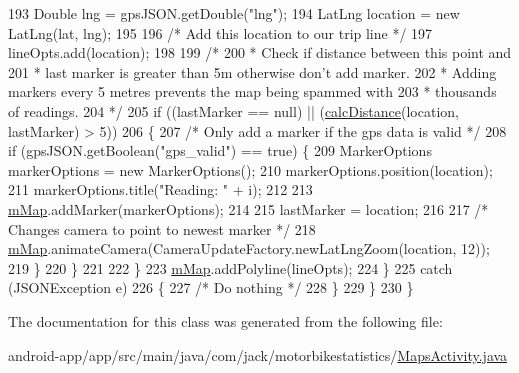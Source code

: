 \begin{DoxyCode}
193                     Double lng = gpsJSON.getDouble(\textcolor{stringliteral}{"lng"});
194                     LatLng location = \textcolor{keyword}{new} LatLng(lat, lng);
195 
196                     \textcolor{comment}{/* Add this location to our trip line */}
197                     lineOpts.add(location);
198 
199                     \textcolor{comment}{/*}
200 \textcolor{comment}{                     * Check if distance between this point and}
201 \textcolor{comment}{                     * last marker is greater than 5m otherwise don't add marker.}
202 \textcolor{comment}{                     * Adding markers every 5 metres prevents the map being spammed with}
203 \textcolor{comment}{                     * thousands of readings.}
204 \textcolor{comment}{                     */}
205                     \textcolor{keywordflow}{if} ((lastMarker == null) || (\hyperlink{classcom_1_1jack_1_1motorbikestatistics_1_1_maps_activity_af4feb7617c02a59c62d6e9257914e997}{calcDistance}(location, lastMarker) > 5))
206                     \{
207                         \textcolor{comment}{/* Only add a marker if the gps data is valid */}
208                         \textcolor{keywordflow}{if} (gpsJSON.getBoolean(\textcolor{stringliteral}{"gps\_valid"}) == \textcolor{keyword}{true}) \{
209                             MarkerOptions markerOptions = \textcolor{keyword}{new} MarkerOptions();
210                             markerOptions.position(location);
211                             markerOptions.title(\textcolor{stringliteral}{"Reading: "} + i);
212 
213                             \hyperlink{classcom_1_1jack_1_1motorbikestatistics_1_1_maps_activity_aaace5219464acf3df9ac5e9ce913eef5}{mMap}.addMarker(markerOptions);
214 
215                             lastMarker = location;
216 
217                             \textcolor{comment}{/* Changes camera to point to newest marker */}
218                             \hyperlink{classcom_1_1jack_1_1motorbikestatistics_1_1_maps_activity_aaace5219464acf3df9ac5e9ce913eef5}{mMap}.animateCamera(CameraUpdateFactory.newLatLngZoom(location, 12));
219                         \}
220                     \}
221 
222                 \}
223                 \hyperlink{classcom_1_1jack_1_1motorbikestatistics_1_1_maps_activity_aaace5219464acf3df9ac5e9ce913eef5}{mMap}.addPolyline(lineOpts);
224             \}
225             \textcolor{keywordflow}{catch} (JSONException e)
226             \{
227                 \textcolor{comment}{/* Do nothing */}
228             \}
229         \}
230     \}
\end{DoxyCode}


The documentation for this class was generated from the following file\+:\begin{DoxyCompactItemize}
\item 
android-\/app/app/src/main/java/com/jack/motorbikestatistics/\hyperlink{_maps_activity_8java}{Maps\+Activity.\+java}\end{DoxyCompactItemize}
